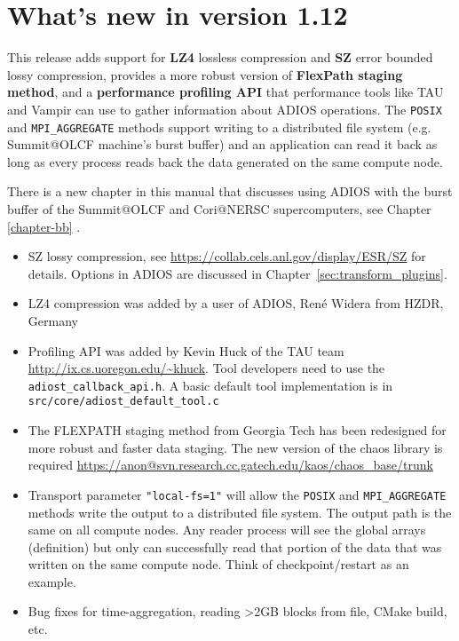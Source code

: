 %
%
\section {What's new in version 1.12}
This release adds support for {\bf LZ4} lossless compression and {\bf SZ} error bounded lossy compression, provides a more robust version of {\bf FlexPath staging method}, and a {\bf performance profiling API} that performance tools like TAU and Vampir can use to gather information about ADIOS operations. The \verb+POSIX+ and \verb+MPI_AGGREGATE+ methods support writing to a distributed file system (e.g. Summit@OLCF machine's burst buffer) and an application can read it back as long as every process reads back the data generated on the same compute node. 

There is a new chapter in this manual that discusses using ADIOS with the burst buffer of the Summit@OLCF and Cori@NERSC supercomputers, see Chapter \ref{chapter-bb} .

\begin{itemize}
\item SZ lossy compression, see  \url{https://collab.cels.anl.gov/display/ESR/SZ} for details. Options in ADIOS are discussed in Chapter~\ref{sec:transform_plugins}.
\item LZ4 compression was added by a user of ADIOS, René Widera from HZDR, Germany
\item Profiling API was added by Kevin Huck of the TAU team \url{http://ix.cs.uoregon.edu/~khuck}. Tool developers need to use the \verb+adiost_callback_api.h+. A basic default tool implementation is in \newline \verb+src/core/adiost_default_tool.c+
\item The FLEXPATH staging method from Georgia Tech has been redesigned for more robust and faster data staging. The new version of the chaos library is required \url{https://anon@svn.research.cc.gatech.edu/kaos/chaos_base/trunk}
\item Transport parameter \verb+"local-fs=1"+ will allow the \verb+POSIX+ and \verb+MPI_AGGREGATE+ methods write the output to a distributed file system. The output path is the same on all compute nodes. Any reader process will see the global arrays (definition) but only can successfully read that portion of the data that was written on the same compute node. Think of checkpoint/restart as an example.
\item Bug fixes for time-aggregation, reading >2GB blocks from file, CMake build, etc.
\end{itemize}



